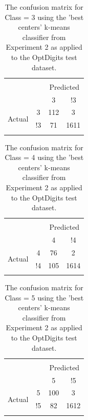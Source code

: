 \documentclass[12pt]{article}
\begin{document}
\begin{table} \centering 
  \caption{The confusion matrix for Class = 3 using the 'best centers' k-means classifier from Experiment 2 as applied to the OptDigits test dataset.} 
  \label{tab:b6} 
\begin{tabular}{lccc} 
\\[-1.8ex]\hline 
\hline \\[-1.8ex] 
\multicolumn{2}{c}{} & \multicolumn{2}{c}{Predicted} \\
\multicolumn{2}{c}{} & 3 & !3\\
\multirow{2}{*}{Actual} & 3 & 112 & 3\\
& !3 & 71 & 1611\\
\hline \\[-1.8ex]
\end{tabular} 
\end{table}

\clearpage	%
\begin{table} \centering 
  \caption{The confusion matrix for Class = 4 using the 'best centers' k-means classifier from Experiment 2 as applied to the OptDigits test dataset.} 
  \label{tab:b7} 
\begin{tabular}{lccc} 
\\[-1.8ex]\hline 
\hline \\[-1.8ex] 
\multicolumn{2}{c}{} & \multicolumn{2}{c}{Predicted} \\
\multicolumn{2}{c}{} & 4 & !4\\
\multirow{2}{*}{Actual} & 4 & 76 & 2\\
& !4 & 105 & 1614\\
\hline \\[-1.8ex]
\end{tabular} 
\end{table}

\begin{table}[!htbp] \centering 
  \caption{The confusion matrix for Class = 5 using the 'best centers' k-means classifier from Experiment 2 as applied to the OptDigits test dataset.} 
  \label{tab:b8} 
\begin{tabular}{lccc} 
\\[-1.8ex]\hline 
\hline \\[-1.8ex] 
\multicolumn{2}{c}{} & \multicolumn{2}{c}{Predicted} \\
\multicolumn{2}{c}{} & 5 & !5\\
\multirow{2}{*}{Actual} & 5 & 100 & 3\\
& !5 & 82 & 1612\\
\hline \\[-1.8ex]
\end{tabular} 
\end{table}
\end{document}
